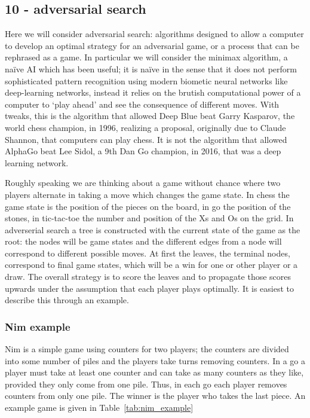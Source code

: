 \documentclass[11pt,a4paper]{scrartcl}
\begin{document}
\subsection*{10 - adversarial search}

Here we will consider adversarial search: algorithms designed to allow
a computer to develop an optimal strategy for an adversarial game, or
a process that can be rephrased as a game. In particular we will
consider the minimax algorithm, a na\"ive AI which has been useful; it
is na\"{i}ve in the sense that it does not perform sophisticated
pattern recognition using modern biometic neural networks like
deep-learning networks, instead it relies on the brutish computational
power of a computer to \lq{}play ahead\rq{} and see the consequence of
different moves. With tweaks, this is the algorithm that allowed Deep
Blue beat Garry Kasparov, the world chess champion, in 1996, realizing
a proposal, originally due to Claude Shannon, that computers can play
chess. It is not the algorithm that allowed AlphaGo beat Lee Sidol, a
9th Dan Go champion, in 2016, that was a deep learning network.

Roughly speaking we are thinking about a game without chance where two
players alternate in taking a move which changes the game state. In
chess the game state is the position of the pieces on the board, in go
the position of the stones, in tic-tac-toe the number and position of
the Xs and Os on the grid. In adverserial search a tree is constructed
with the current state of the game as the root: the nodes will be game
states and the different edges from a node will correspond to
different possible moves. At first the leaves, the terminal nodes,
correspond to final game states, which will be a win for one or other
player or a draw. The overall strategy is to score the leaves and to
propagate those scores upwards under the assumption that each player
plays optimally. It is easiest to describe this through an example. 

\subsubsection*{Nim example}

Nim is a simple game using counters for two players; the counters are
divided into some number of piles and the players take turns removing
counters. In a go a player must take at least one counter and can take
as many counters as they like, provided they only come from one
pile. Thus, in each go each player removes counters from only one
pile. The winner is the player who takes the last piece. An example
game is given in Table~\ref{tab:nim_example}
\end{document}
